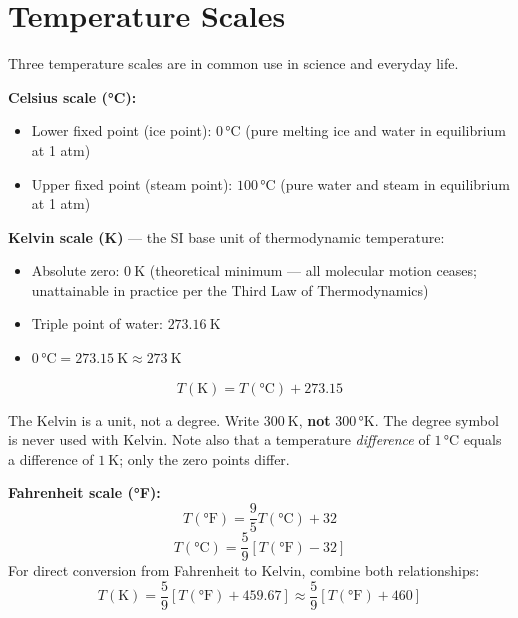 \section{Temperature Scales}

Three temperature scales are in common use in science
and everyday life.

\begin{definitionbox}
\textbf{Celsius scale (°C):}
\begin{itemize}[noitemsep]
  \item Lower fixed point (ice point): $0\,°\text{C}$
  (pure melting ice and water in equilibrium at 1 atm)
  \item Upper fixed point (steam point): $100\,°\text{C}$
  (pure water and steam in equilibrium at 1 atm)
\end{itemize}

\textbf{Kelvin scale (K)} --- the SI base unit of
thermodynamic temperature:
\begin{itemize}[noitemsep]
  \item Absolute zero: $0\ \text{K}$ (theoretical
  minimum --- all molecular motion ceases; unattainable
  in practice per the Third Law of Thermodynamics)
  \item Triple point of water: $273.16\ \text{K}$
  \item $0\,°\text{C} = 273.15\ \text{K}
  \approx 273\ \text{K}$
\end{itemize}
\[
  T(\text{K}) = T(°\text{C}) + 273.15
\]
\begin{notebox}
The Kelvin is a unit, not a degree. Write $300\ \text{K}$,
\textbf{not} $300\,°\text{K}$. The degree symbol is
never used with Kelvin. Note also that a temperature
\emph{difference} of $1\,°\text{C}$ equals a difference
of $1\ \text{K}$; only the zero points differ.
\end{notebox}

\textbf{Fahrenheit scale (°F):}
\[
  T(°\text{F}) = \frac{9}{5}T(°\text{C}) + 32
\]
\[
  T(°\text{C}) = \frac{5}{9}\left[T(°\text{F}) - 32\right]
\]
For direct conversion from Fahrenheit to Kelvin,
combine both relationships:
\[
  T(\text{K}) = \frac{5}{9}\left[T(°\text{F})
  + 459.67\right] \approx \frac{5}{9}
  \left[T(°\text{F}) + 460\right]
\]
\end{definitionbox}

